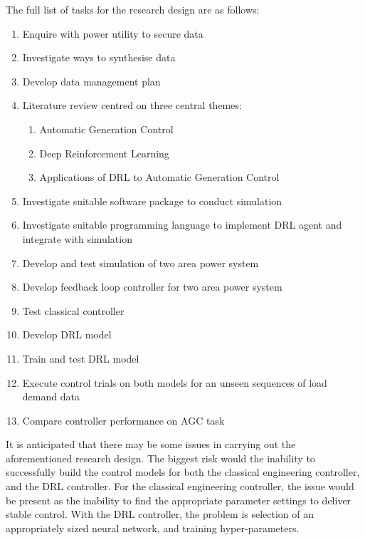 The full list of tasks for the research design are as follows:
\begin{enumerate}
	\item Enquire with power utility to secure data
	\item Investigate ways to synthesise data
	\item Develop data management plan
	\item Literature review centred on three central themes:
	\begin{enumerate}
		\item Automatic Generation Control
		\item Deep Reinforcement Learning
		\item Applications of DRL to Automatic Generation Control
	\end{enumerate}
	\item Investigate suitable software package to conduct simulation
	\item Investigate suitable programming language to implement DRL agent and integrate with simulation
	\item Develop and test simulation of two area power system
	\item Develop feedback loop controller for two area power system
	\item Test classical controller
	\item Develop DRL model
	\item Train and test DRL model
	\item Execute control trials on both models for an unseen sequences of load demand data
	\item Compare controller performance on AGC task
\end{enumerate}

It is anticipated that there may be some issues in carrying out the aforementioned research design. The biggest risk would the inability to successfully build the control models for both the classical engineering controller, and the DRL controller. For the classical engineering controller, the issue would be present as the inability to find the appropriate parameter settings to deliver stable control. With the DRL controller, the problem is selection of an appropriately sized neural network, and training hyper-parameters.